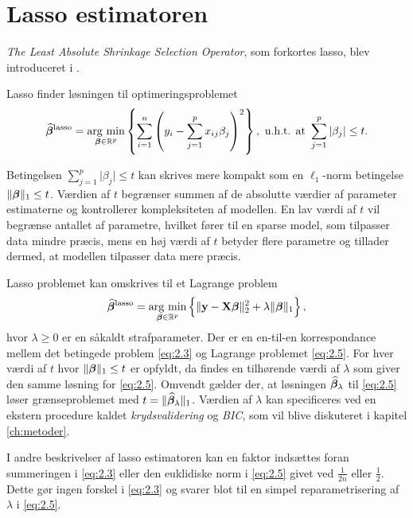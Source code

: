 \section{Lasso estimatoren} \label{sec:lasso_estimatoren}
\textit{The Least Absolute Shrinkage Selection Operator}, som forkortes lasso, blev introduceret i \citep{lasso}. 
\begin{defn}[Lasso]
Lasso finder løsningen til optimeringsproblemet
\begin{align}
\widehat{\tbeta}^\text{lasso} = \argmin_{\tbeta \in \R^p} \cbr{\sum_{i=1}^n \del{y_i - \sum_{j=1}^p x_{ij} \beta_j}^2}, \ \text{u.h.t. at } \sum_{j=1}^p \vert \beta_j \vert \leq t. \label{eq:2.3}
\end{align} 
\end{defn}
Betingelsen $\sum_{j=1}^p \vert \beta_j \vert \leq t$ kan skrives mere kompakt som en \(\ell_1\)-norm betingelse $\Vert \boldsymbol{\beta} \Vert_1 \leq t$.
Værdien af \(t\) begrænser summen af de absolutte værdier af parameter estimaterne og kontrollerer kompleksiteten af modellen. 
En lav værdi af \(t\) vil begrænse antallet af parametre, hvilket fører til en sparse model, som tilpasser data mindre præcis, mens en høj værdi af \(t\) betyder flere parametre og tillader dermed, at modellen tilpasser data mere præcis.

Lasso problemet kan omskrives til et Lagrange problem
\begin{align}
\widehat{\tbeta}^\text{lasso} = \argmin_{\tbeta \in \R^p} \cbr{ \Vert \y - \X \tbeta \Vert_2^2 + \lambda \Vert \tbeta \Vert_1}, \label{eq:2.5}
\end{align}
hvor $\lambda \geq 0$ er en såkaldt strafparameter. 
Der er en en-til-en korrespondance mellem det betingede problem \eqref{eq:2.3} og Lagrange problemet \eqref{eq:2.5}. 
For hver værdi af \(t\) hvor \(\Vert \boldsymbol{\beta} \Vert_1 \leq t\) er opfyldt, da findes en tilhørende værdi af $\lambda$ som giver den samme løsning for \eqref{eq:2.5}.
Omvendt gælder der, at løsningen $\widehat{\boldsymbol{\beta}}_\lambda$ til \eqref{eq:2.5} løser grænseproblemet med $t=\Vert \widehat{\boldsymbol{\beta}}_\lambda \Vert_1$.
Værdien af \(\lambda\) kan specificeres ved en ekstern procedure kaldet \textit{krydsvalidering} og \textit{BIC}, som vil blive diskuteret i kapitel \ref{ch:metoder}.

I andre beskrivelser af lasso estimatoren kan en faktor indsættes foran summeringen i \eqref{eq:2.3} eller den euklidiske norm i \eqref{eq:2.5} givet ved \(\frac{1}{2n}\) eller \(\frac{1}{2}\).
Dette gør ingen forskel i \eqref{eq:2.3} og svarer blot til en simpel reparametrisering af \(\lambda\) i \eqref{eq:2.5}.

